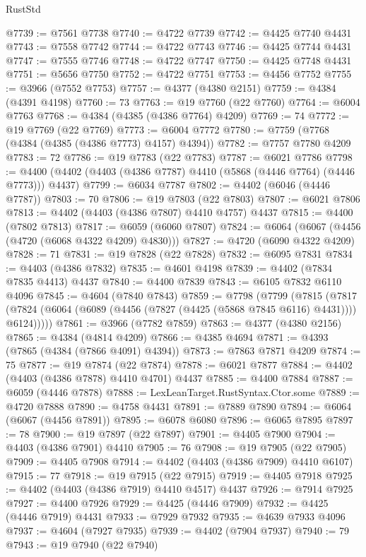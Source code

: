 \begin{lexlean}{RustStd}
\begin{coremodule}
@7739 := @7561 @7738
@7740 := @4722 @7739
@7742 := @4425 @7740 @4431
@7743 := @7558 @7742
@7744 := @4722 @7743
@7746 := @4425 @7744 @4431
@7747 := @7555 @7746
@7748 := @4722 @7747
@7750 := @4425 @7748 @4431
@7751 := @5656 @7750
@7752 := @4722 @7751
@7753 := @4456 @7752
@7755 := @3966 (@7552 @7753)
@7757 := @4377 (@4380 @2151)
@7759 := @4384 (@4391 @4198)
@7760 := 73
@7763 := @19 @7760 (@22 @7760)
@7764 := @6004 @7763
@7768 := @4384 (@4385 (@4386 @7764) @4209)
@7769 := 74
@7772 := @19 @7769 (@22 @7769)
@7773 := @6004 @7772
@7780 := @7759 (@7768 (@4384 (@4385 (@4386 @7773) @4157) @4394))
@7782 := @7757 @7780 @4209
@7783 := 72
@7786 := @19 @7783 (@22 @7783)
@7787 := @6021 @7786
@7798 := @4400 (@4402 (@4403 (@4386 @7787) @4410 (@5868 (@4446 @7764) (@4446 @7773))) @4437)
@7799 := @6034 @7787
@7802 := @4402 (@6046 (@4446 @7787))
@7803 := 70
@7806 := @19 @7803 (@22 @7803)
@7807 := @6021 @7806
@7813 := @4402 (@4403 (@4386 @7807) @4410 @4757) @4437
@7815 := @4400 (@7802 @7813)
@7817 := @6059 (@6060 @7807)
@7824 := @6064 (@6067 (@4456 (@4720 (@6068 @4322 @4209) @4830)))
@7827 := @4720 (@6090 @4322 @4209)
@7828 := 71
@7831 := @19 @7828 (@22 @7828)
@7832 := @6095 @7831
@7834 := @4403 (@4386 @7832)
@7835 := @4601 @4198
@7839 := @4402 (@7834 @7835 @4413) @4437
@7840 := @4400 @7839
@7843 := @6105 @7832 @6110 @4096
@7845 := @4604 (@7840 @7843)
@7859 := @7798
    (@7799
      (@7815
        (@7817 (@7824 (@6064 (@6089 (@4456 (@7827 (@4425 (@5868 @7845 @6116) @4431)))) @6124)))))
@7861 := @3966 (@7782 @7859)
@7863 := @4377 (@4380 @2156)
@7865 := @4384 (@4814 @4209)
@7866 := @4385 @4694
@7871 := @4393 (@7865 (@4384 (@7866 @4091) @4394))
@7873 := @7863 @7871 @4209
@7874 := 75
@7877 := @19 @7874 (@22 @7874)
@7878 := @6021 @7877
@7884 := @4402 (@4403 (@4386 @7878) @4410 @4701) @4437
@7885 := @4400 @7884
@7887 := @6059 (@4446 @7878)
@7888 := LexLeanTarget.RustSyntax.Ctor.some
@7889 := @4720 @7888
@7890 := @4758 @4431
@7891 := @7889 @7890
@7894 := @6064 (@6067 (@4456 @7891))
@7895 := @6078 @6080
@7896 := @6065 @7895
@7897 := 78
@7900 := @19 @7897 (@22 @7897)
@7901 := @4405 @7900
@7904 := @4403 (@4386 @7901) @4410
@7905 := 76
@7908 := @19 @7905 (@22 @7905)
@7909 := @4405 @7908
@7914 := @4402 (@4403 (@4386 @7909) @4410 @6107)
@7915 := 77
@7918 := @19 @7915 (@22 @7915)
@7919 := @4405 @7918
@7925 := @4402 (@4403 (@4386 @7919) @4410 @4517) @4437
@7926 := @7914 @7925
@7927 := @4400 @7926
@7929 := @4425 (@4446 @7909)
@7932 := @4425 (@4446 @7919) @4431
@7933 := @7929 @7932
@7935 := @4639 @7933 @4096
@7937 := @4604 (@7927 @7935)
@7939 := @4402 (@7904 @7937)
@7940 := 79
@7943 := @19 @7940 (@22 @7940)

\end{coremodule}
\end{lexlean}
